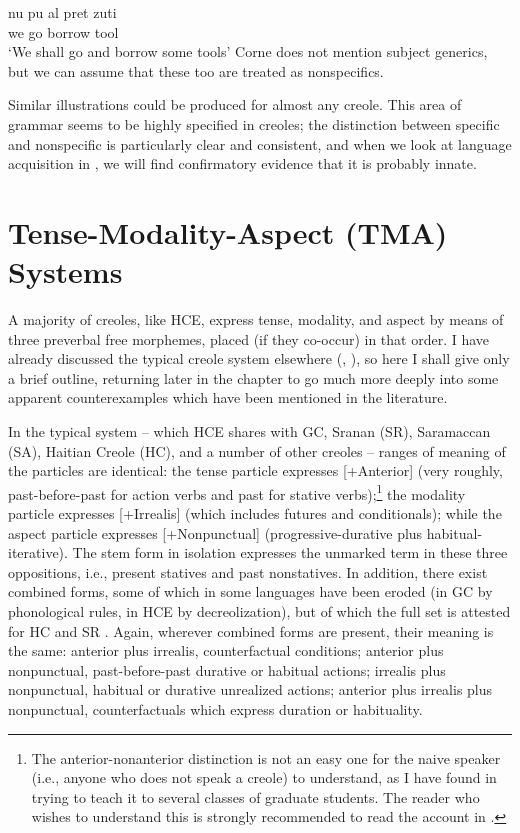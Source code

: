 \ea\label{ex:2:26}
 \gll nu pu al pret zuti\\
we {\IRR} go borrow tool \\
\glt `We shall go and borrow some tools'
\z
Corne does not mention subject generics, but we can assume that these too are treated as nonspecifics.

Similar illustrations could be produced for almost any creole. This area of grammar seems to be highly specified in creoles; the dis\-tinction between specific and nonspecific is particularly clear and consistent, and when we look at language acquisition in , we will find confirmatory evidence that it is probably innate.

\section{Tense-Modality-Aspect (TMA) Systems}

A majority of creoles, like HCE, express tense, modality, and aspect by means of three preverbal free morphemes, placed (if they co-occur) in that order. I have already discussed the typical creole system elsewhere (\citealt{Bickerton1974}, \citeyear[Chapter 2]{Bickerton1975}), so here I shall give only a brief outline, returning later in the chapter to go much more deeply into some apparent counterexamples which have been men\-tioned in the literature.

In the typical system -- which HCE shares with GC, Sranan (SR), Saramaccan (SA), Haitian Creole (HC), and a number of other creoles -- ranges of meaning of the particles are identical: the tense particle ex\-presses [+Anterior] (very roughly, past-before-past for action verbs and past for stative verbs);\footnote{The anterior-nonanterior distinction is not an easy one for the naive speaker (i.e., anyone who does not speak a creole) to under\-stand, as I have found in trying to teach it to several classes of graduate students. The reader who wishes to understand this is strongly recom\-mended to read the account in \citet[Chapter 2]{Bickerton1975}.} the modality particle expresses [+Irrealis] (which includes futures and conditionals); while the aspect particle expresses [+Nonpunctual] (progressive-durative plus habitual-iterative). The stem form in isolation expresses the unmarked term in these three oppositions, i.e., present statives and past nonstatives. In addition, there exist combined forms, some of which in some languages have been eroded (in GC by phonological rules, in HCE by decreolization), but of which the full set is attested for HC \citep{Hall1953} and SR \citep{Voorhoeve1957}. Again, wherever combined forms are present, their meaning is the same: anterior plus irrealis, counterfactual conditions; anterior plus nonpunctual, past-before-past durative or habitual actions; irrealis plus nonpunctual, habitual or durative unrealized actions; anterior plus irrealis plus nonpunctual, counterfactuals which express duration or habituality.

